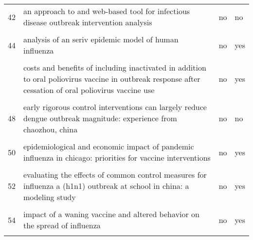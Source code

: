 \documentclass[
]{article}
\begin{document}
\begin{landscape}
\begin{longtable}{l>{\raggedright\arraybackslash}p{4cm}l>{\raggedright\arraybackslash}p{4cm}}
42 & an approach to and web-based tool for infectious disease outbreak intervention analysis & no & no\\
\cellcolor{gray!6}{43} & \cellcolor{gray!6}{an economic assessment of foot and mouth disease in japan} & \cellcolor{gray!6}{no} & \cellcolor{gray!6}{yes}\\
44 & analysis of an seriv epidemic model of human influenza & no & yes\\
\cellcolor{gray!6}{45} & \cellcolor{gray!6}{control strategies of avian influenza pandemic model with time delay} & \cellcolor{gray!6}{no} & \cellcolor{gray!6}{no}\\
\addlinespace
46 & costs and benefits of including inactivated in addition to oral poliovirus vaccine in outbreak response after cessation of oral poliovirus vaccine use & no & yes\\
\cellcolor{gray!6}{47} & \cellcolor{gray!6}{deriving effective vaccine allocation strategies for pandemic influenza: comparison of an agent-based simulation and a compartmental model} & \cellcolor{gray!6}{no} & \cellcolor{gray!6}{yes}\\
48 & early rigorous control interventions can largely reduce dengue outbreak magnitude: experience from chaozhou, china & no & no\\
\cellcolor{gray!6}{49} & \cellcolor{gray!6}{effects of reactive social distancing on the 1918 influenza pandemic} & \cellcolor{gray!6}{no} & \cellcolor{gray!6}{no}\\
50 & epidemiological and economic impact of pandemic influenza in chicago: priorities for vaccine interventions & no & yes\\
\addlinespace
\cellcolor{gray!6}{51} & \cellcolor{gray!6}{estimating direct and indirect protective effect of influenza vaccination in the united states} & \cellcolor{gray!6}{no} & \cellcolor{gray!6}{yes}\\
52 & evaluating the effects of common control measures for influenza a (h1n1) outbreak at school in china: a modeling study & no & yes\\
\cellcolor{gray!6}{53} & \cellcolor{gray!6}{evaluation of strategies to control a potential outbreak of foot-and-mouth disease in sweden} & \cellcolor{gray!6}{no} & \cellcolor{gray!6}{yes}\\
54 & impact of a waning vaccine and altered behavior on the spread of influenza & no & yes\\
\cellcolor{gray!6}{55} & \cellcolor{gray!6}{mathematical models for devising the optimal ebola virus disease eradication} & \cellcolor{gray!6}{no} & \cellcolor{gray!6}{yes}\\

\end{longtable}
\end{landscape}
\end{document}
